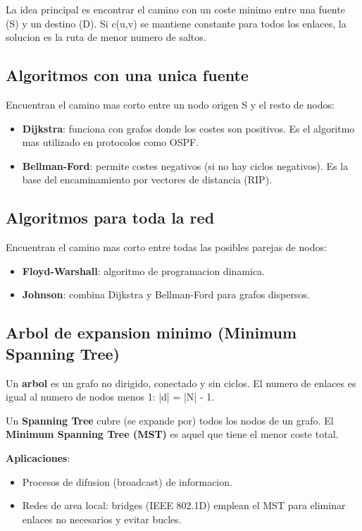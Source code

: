 La idea principal es encontrar el camino con un coste minimo entre una fuente
(S) y un destino (D). Si c(u,v) se mantiene constante para todos los enlaces,
la solucion es la ruta de menor numero de saltos.

\subsection{Algoritmos con una unica fuente}

Encuentran el camino mas corto entre un nodo origen S y el resto de nodos:

\begin{itemize}
    \item \textbf{Dijkstra}: funciona con grafos donde los costes son positivos.
    Es el algoritmo mas utilizado en protocolos como OSPF.
    \item \textbf{Bellman-Ford}: permite costes negativos (si no hay ciclos negativos).
    Es la base del encaminamiento por vectores de distancia (RIP).
\end{itemize}

\subsection{Algoritmos para toda la red}

Encuentran el camino mas corto entre todas las posibles parejas de nodos:

\begin{itemize}
    \item \textbf{Floyd-Warshall}: algoritmo de programacion dinamica.
    \item \textbf{Johnson}: combina Dijkstra y Bellman-Ford para grafos dispersos.
\end{itemize}

\subsection{Arbol de expansion minimo (Minimum Spanning Tree)}

Un \textbf{arbol} es un grafo no dirigido, conectado y sin ciclos. El numero de
enlaces es igual al numero de nodos menos 1: |d| = |N| - 1.

Un \textbf{Spanning Tree} cubre (se expande por) todos los nodos de un grafo. El
\textbf{Minimum Spanning Tree (MST)} es aquel que tiene el menor coste total.

\textbf{Aplicaciones}:
\begin{itemize}
    \item Procesos de difusion (broadcast) de informacion.
    \item Redes de area local: bridges (IEEE 802.1D) emplean el MST para eliminar
    enlaces no necesarios y evitar bucles.
\end{itemize}

